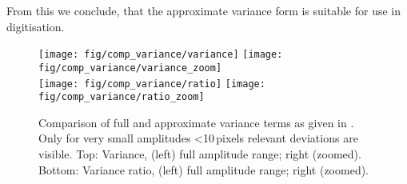 \documentclass[12pt]{article} %
\begin{document}
\begin{appendices}
From this we conclude, that the approximate variance form is suitable for use in digitisation.
%
%
\begin{figure}
\center
  \texttt{[image: fig/comp\_variance/variance]}
  \texttt{[image: fig/comp\_variance/variance\_zoom]} \\
  \texttt{[image: fig/comp\_variance/ratio]}
  \texttt{[image: fig/comp\_variance/ratio\_zoom]}
  \caption{Comparison of full and approximate variance terms as given in \cite{PPD}. Only for very small amplitudes  \textless 10\,pixels relevant deviations are visible.
    Top: Variance, (left) full amplitude range; right (zoomed).
    Bottom: Variance ratio, (left) full amplitude range; right (zoomed).}
\label{fig:variance}
\end{figure}


\end{appendices}
\end{document}
